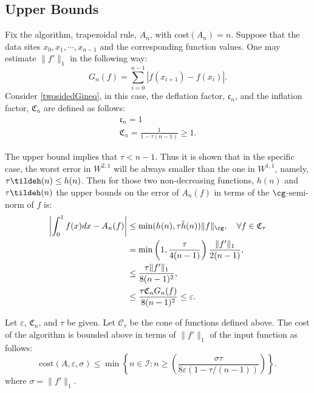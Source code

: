 \subsection{Upper Bounds}
 Fix the algorithm, trapezoidal rule, $A_n$, with cost$(A_n)=n$. Suppose that the data sites $x_0,x_1,\cdots, x_{n-1}$ and the corresponding function values. One may estimate $\|f'\|_1$ in the following way: $$G_n(f)=\sum_{i=0}^{n-1}\left|f(x_{i+1})-f(x_{i})\right|.$$ Consider \eqref{twosidedGineq}, in this case, the deflation factor, $\mathfrak{c}_n$, and the inflation factor, $\mathfrak{C}_n$ are defined as follows:
\begin{gather*}
\mathfrak{c}_n =1 \\%
\mathfrak{C}_n =\frac{1}{1 - \tau (n-1)} \ge 1.
\end{gather*}

The upper bound implies that $\tau < n-1.$ Thus it is shown that in the specific case, the worst error in $W^{2,1}$ will be always smaller than the one in $W^{1,1}$, namely, $\tau \tildeh(n)\leq h(n)$. Then for those two non-decreasing functions, $h(n)$ and $\tau \tildeh(n)$ the upper bounds on the error of $A_n(f)$ in terms of the $\cg$-semi-norm of $f$ is:
\begin{align*}
  \left|\int_{0}^{1}f(x)dx-A_n(f)\right|& \leq \min(h(n),\tau\tilde{h}(n))\|f\|_{\cg}, \quad \forall f \in \mathfrak{C}_{\tau}\\
  &= \min\left(1,\frac{\tau}{4(n-1)}\right)\frac{\|f'\|_{1}}{2(n-1)},\\
  &\leq \frac{\tau\|f'\|_{1}}{8(n-1)^2},\\
  &\leq \frac{\tau\mathfrak{C}_n G_n(f)}{8(n-1)^2}\leq\varepsilon.
\end{align*}
 \begin{theorem}
   Let $\varepsilon$, $\mathfrak{C}_n$, and $\tau$ be given. Let $\mathcal{C}_{\tau}$ be the cone of functions defined above. The cost of the algorithm is bounded above in terms of $\|f'\|_{1}$ of the input function as follows:
   $$\text{cost}(A,\varepsilon,\sigma)\leq\min\left\{n\in\mathcal{I}:n\geq\left(\frac{\sigma\tau}{8\varepsilon(1-\tau/(n-1))}\right)\right\}.$$
   where $\sigma=\|f'\|_{1}.$
 \end{theorem}

